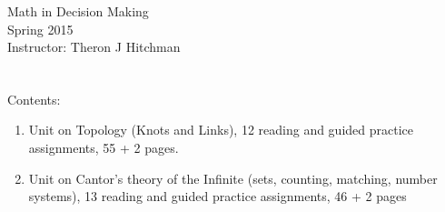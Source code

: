 \documentclass[12pt]{article}
\begin{document}
\thispagestyle{empty}

\begin{center}
{\Huge Math in Decision Making}\\[1in]
{\Large Spring 2015}\\[.5in] 
{\Large Instructor: Theron J Hitchman}
\end{center}



\clearpage
\thispagestyle{empty}
$\phantom{Theron J Hitchman}$
\newpage

{\Large
Contents:
\begin{enumerate}
\item Unit on Topology (Knots and Links), 12 reading and guided practice assignments, 55 + 2 pages.

\item Unit on Cantor's theory of the Infinite (sets, counting, matching, number systems), 13 reading and guided practice assignments, 46 + 2 pages
\end{enumerate}
}
\newpage
$\phantom{Theron J Hitchman}$
\newpage


$\phantom{Theron J Hitchman}$
\newpage

\end{document}

